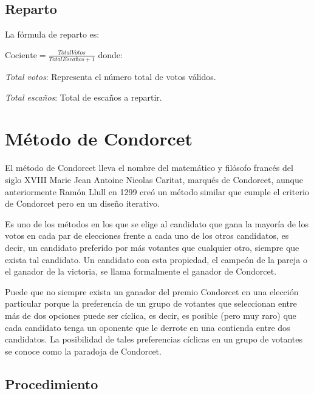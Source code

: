 \documentclass[12pt,a4paper,]{book}
\numberwithin{dummy}{section}
\theoremstyle{ocrenumbox}
\theoremstyle{blacknumex}
\theoremstyle{blacknumbox}
\theoremstyle{ocrenum}
\theoremstyle{ocrenum}
\begin{document}
\hypertarget{reparto-2}{%
\subsection{Reparto}\label{reparto-2}}

La fórmula de reparto es:

\(\textrm{Cociente} = \frac{Total Votos}{Total Escaños+1}\) donde:

\emph{Total votos}: Representa el número total de votos válidos.

\emph{Total escaños}: Total de escaños a repartir.

\hypertarget{muxe9todo-de-condorcet}{%
\section{Método de Condorcet}\label{muxe9todo-de-condorcet}}

El método de Condorcet lleva el nombre del matemático y filósofo francés
del siglo XVIII Marie Jean Antoine Nicolas Caritat, marqués de
Condorcet, aunque anteriormente Ramón Llull en 1299 creó un método
similar que cumple el criterio de Condorcet pero en un diseño iterativo.

Es uno de los métodos en los que se elige al candidato que gana la
mayoría de los votos en cada par de elecciones frente a cada uno de los
otros candidatos, es decir, un candidato preferido por más votantes que
cualquier otro, siempre que exista tal candidato. Un candidato con esta
propiedad, el campeón de la pareja o el ganador de la victoria, se llama
formalmente el ganador de Condorcet.

Puede que no siempre exista un ganador del premio Condorcet en una
elección particular porque la preferencia de un grupo de votantes que
seleccionan entre más de dos opciones puede ser cíclica, es decir, es
posible (pero muy raro) que cada candidato tenga un oponente que le
derrote en una contienda entre dos candidatos. La posibilidad de tales
preferencias cíclicas en un grupo de votantes se conoce como la paradoja
de Condorcet.

\hypertarget{procedimiento}{%
\subsection{Procedimiento}\label{procedimiento}}
\end{document}
